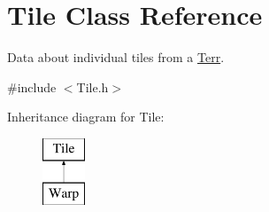\hypertarget{class_tile}{}\section{Tile Class Reference}
\label{class_tile}


Data about individual tiles from a \hyperlink{class_terr}{Terr}.  




{\ttfamily \#include $<$Tile.\+h$>$}

Inheritance diagram for Tile\+:\begin{figure}[H]
\begin{center}
\leavevmode
\includegraphics[height=2.000000cm]{class_tile}
\end{center}
\end{figure}
